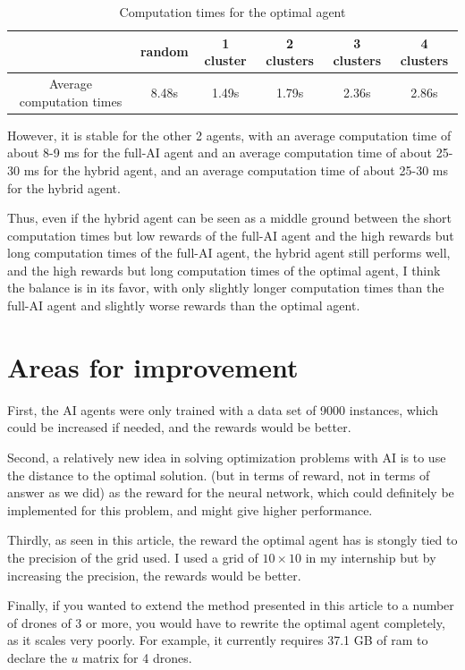 \documentclass[letterpaper]{article}
\begin{document}
\begin{table}[!h]
\begin{center}
    \caption{Computation times for the optimal agent}
    \begin{tabular}{|c|c|c|c|c|c|}
    \hline 
       & random & 1 cluster & 2 clusters & 3 clusters & 4 clusters \\ 
     \hline
     Average computation times & 8.48s & 1.49s & 1.79s & 2.36s & 2.86s \\  
     \hline
    \end{tabular}
\end{center}
\end{table}

However, it is stable for the other 2 agents, with an average computation time of about 8-9 ms for the full-AI agent and an average computation time of about 25-30 ms for the hybrid agent,
and an average computation time of about 25-30 ms for the hybrid agent.

Thus, even if the hybrid agent can be seen as a middle ground between the short computation times but low rewards of the full-AI agent and the high rewards but long computation times of the full-AI agent, the hybrid agent still performs well,
and the high rewards but long computation times of the optimal agent, I think the balance is in its favor,
with only slightly longer computation times than the full-AI agent and slightly worse rewards than the optimal agent.


\section{Areas for improvement}

First, the AI agents were only trained with a data set of 9000 instances, which could be increased if needed,
and the rewards would be better.

Second, a relatively new idea in solving optimization problems with AI is to use the distance to the optimal solution.
(but in terms of reward, not in terms of answer as we did) as the reward for the neural network, which could definitely be implemented for this problem,
and might give higher performance.

Thirdly, as seen in this article\cite{main_article}, the reward the optimal agent has is stongly tied to the precision of the grid used.
I used a grid of $10 \times 10$ in my internship but by increasing the precision, the rewards would be better.

Finally, if you wanted to extend the method presented in this article to a number of drones of 3 or more, you would have to
rewrite the optimal agent completely, as it scales very poorly.
For example, it currently requires 37.1 GB of ram to declare the $u$ matrix for 4 drones.
\end{document}
